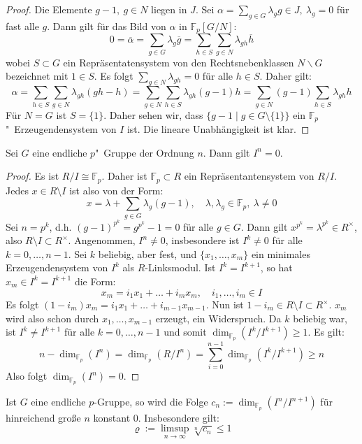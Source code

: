 \documentclass[11pt,a4paper,openany]{memoir}
\begin{document}
\begin{proof}
Die Elemente $g-1,\ g\in N$ liegen in $J$. Sei $\alpha=\sum_{g\in G}\lambda_gg\in J,\ \lambda_g=0$ für fast alle $g$. Dann gilt für das Bild von $\alpha$ in $\mathbb{F}_p[G/N]$:
\[0=\overline{\alpha}= \sum_{g\in G} \lambda_g\overline{g} = \sum_{h\in S}\sum_{g\in N} \lambda_{gh}\overline{h}\]
wobei $S\subset G$ ein Repräsentatensystem von den Rechtsnebenklassen $N\backslash G$ bezeichnet mit $1\in S$. Es folgt $\sum_{g\in N}\lambda_{gh}=0$ für alle $h\in S$. Daher gilt: 
\[\alpha= \sum_{h\in S}\sum_{g\in N}\lambda_{gh}(gh-h) =\sum_{g\in N} \sum_{h\in S} \lambda_{gh} (g-1)h = \sum_{g\in N} (g-1)\sum_{h\in S}\lambda_{gh}h \]
Für $N=G$ ist $S=\{1\}$. Daher sehen wir, dass $\{g-1\mid g\in G \setminus\{1\}\}$ ein $\mathbb{F}_p$"~Erzeugendensystem von $I$ ist. Die lineare Unabhängigkeit ist klar.
\end{proof}

\begin{proposition}\label{lemma:unipotency}
Sei $G$ eine endliche $p$"~Gruppe der Ordnung $n$. Dann gilt $I^n=0$.
\end{proposition}

\begin{proof}
Es ist $R/I\cong\mathbb{F}_p$. Daher ist $\mathbb{F}_p\subset R$ ein Repräsentantensystem von $R/I$. Jedes $x\in R\setminus I$ ist also von der Form: 
\[x=\lambda + \sum_{g\in G} \lambda_g (g-1),\quad \lambda,\lambda_g\in \mathbb{F}_p,\ \lambda\neq 0 \]
Sei $n=p^k$, d.h. $(g-1)^{p^k}=g^{p^k}-1=0$ für alle $g\in G$. Dann gilt $x^{p^k}=\lambda^{p^k}\in R^\times$, also $R\setminus I\subset R^\times$. Angenommen, $I^n\neq 0$, insbesondere ist $I^k\neq 0$ für alle $k=0,\ldots,n-1$. Sei $k$ beliebig, aber fest, und $\{x_1,\ldots,x_m\}$ ein minimales Erzeugendensystem von $I^k$ als $R$-Linksmodul. Ist $I^k=I^{k+1}$, so hat $x_m\in I^k=I^{k+1}$ die Form:
\[x_m = i_1x_1+\ldots+i_mx_m,\quad i_1,\ldots,i_m\in I  \]
Es folgt $(1-i_m)x_m=i_1x_1+\ldots+i_{m-1}x_{m-1}$. Nun ist $1-i_m\in R\setminus I\subset R^\times$. $x_m$ wird also schon durch $x_1,\ldots,x_{m-1}$ erzeugt, ein Widerspruch. Da $k$ beliebig war, ist $I^k\neq I^{k+1}$ für alle $k=0,\ldots,n-1$ und somit $\dim_{\mathbb{F}_p}(I^k/I^{k+1})\geq 1$. Es gilt:
\[n- \dim_{\mathbb{F}_p}(I^n)= \dim_{\mathbb{F}_p}(R/I^n) = \sum_{i=0}^{n-1} \dim_{\mathbb{F}_p}(I^k/I^{k+1})\geq n  \]
Also folgt $\dim_{\mathbb{F}_p}(I^n)=0$.
\end{proof}

\begin{corollary}\label{cor:finite-group-rho}
Ist $G$ eine endliche $p$-Gruppe, so wird die Folge $c_n:=\dim_{\mathbb{F}_p}(I^n/I^{n+1})$ für hinreichend große $n$ konstant $0$. Insbesondere gilt:
\[\varrho:=\limsup_{n\to\infty}\sqrt[n]{c_n}\leq 1 \]
\end{corollary}
\end{document}
